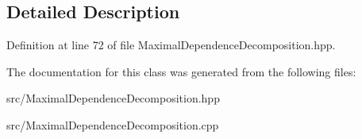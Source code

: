 \subsection{Detailed Description}


Definition at line 72 of file Maximal\+Dependence\+Decomposition.\+hpp.



The documentation for this class was generated from the following files\+:\begin{DoxyCompactItemize}
\item 
src/Maximal\+Dependence\+Decomposition.\+hpp\item 
src/Maximal\+Dependence\+Decomposition.\+cpp\end{DoxyCompactItemize}
